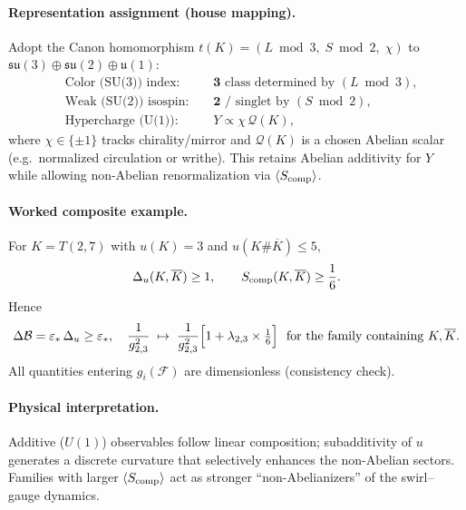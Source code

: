 \documentclass[11pt]{article}
\begin{document}
        \paragraph{Representation assignment (house mapping).}
            Adopt the Canon homomorphism \(t(K)=(L \bmod 3,\;S \bmod 2,\;\chi)\) to \(\mathfrak{su}(3)\oplus\mathfrak{su}(2)\oplus\mathfrak u(1)\):
            \[
                \begin{aligned}
                &\text{Color (SU(3)) index: } &&\mathbf 3 \text{ class determined by } (L \bmod 3),\\
                &\text{Weak (SU(2)) isospin: } &&\mathbf 2 \text{ / singlet by } (S \bmod 2),\\
                &\text{Hypercharge (U(1)): } &&Y\propto \chi\, \mathcal Q(K),
                \end{aligned}
            \]
            where \(\chi\in\{\pm1\}\) tracks chirality/mirror and \(\mathcal Q(K)\) is a chosen Abelian scalar (e.g.\ normalized circulation or writhe). This retains Abelian additivity for \(Y\) while allowing non-Abelian renormalization via \(\langle S_{\rm comp}\rangle\).

        \paragraph{Worked composite example.}
            For \(K=T(2,7)\) with \(u(K)=3\) and \(u(K\#\overline K)\le 5\),
            \[
                \Delta_u(K,\overline K)\ge 1,\qquad
                S_{\rm comp}(K,\overline K)\ge \frac{1}{6}.
            \]
            Hence
            \[
                \Delta\mathcal B=\varepsilon_*\,\Delta_u\ge \varepsilon_*,
                \quad
                \frac{1}{g_{2,3}^2}\;\mapsto\;\frac{1}{g_{2,3}^2}\Bigl[1+\lambda_{2,3}\times\tfrac{1}{6}\Bigr]
                \ \ \text{for the family containing }K,\overline K.
            \]
            All quantities entering \(g_i(\mathcal F)\) are dimensionless (consistency check).

        \paragraph{Physical interpretation.}
            Additive (\(U(1)\)) observables follow linear composition; subadditivity of \(u\) generates a discrete curvature that selectively enhances the non-Abelian sectors. Families with larger \(\langle S_{\rm comp}\rangle\) act as stronger “non-Abelianizers” of the swirl–gauge dynamics.
\end{document}
